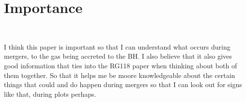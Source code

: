 \documentclass{article}
\begin{document}
\section{Importance}
\
\par  I think this paper is important so that I can understand what occurs during mergers, to the gas being accreted to the BH. I also believe that it also gives good information that ties into the RG118 paper when thinking about both of them together. So that it helps me be moore knowledgeable about the certain things that could and do happen during mergers so that I can look out for signs like that, during plots perhaps. 
\end{document}
